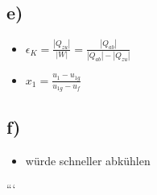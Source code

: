 \subsection*{e)}
\begin{itemize}
    \item $\epsilon_K = \frac{|Q_{zu}|}{|W|} = \frac{|Q_{ab}|}{|Q_{ab}| - |Q_{zu}|}$
    \item $x_1 = \frac{u_1 - u_{1g}}{u_{1g} - u_f}$
\end{itemize}

\subsection*{f)}
\begin{itemize}
    \item würde schneller abkühlen
\end{itemize}

```
